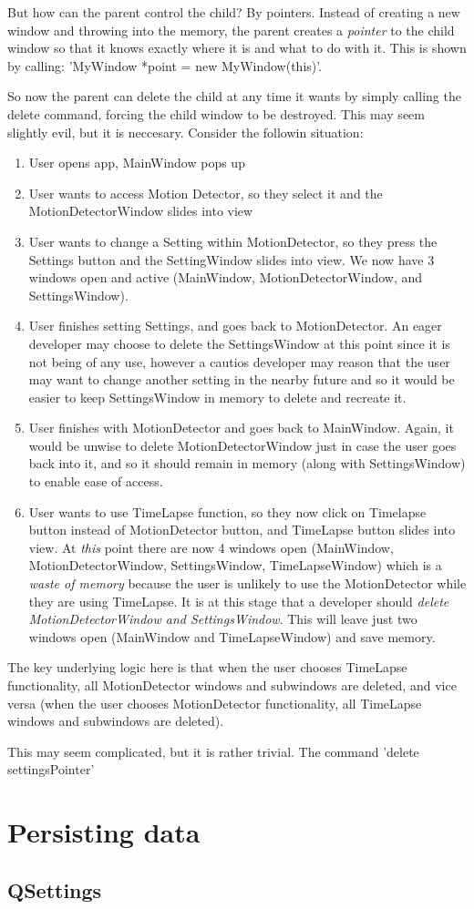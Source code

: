 But how can the parent control the child? By pointers. Instead of creating a new window and throwing into the memory, the parent creates a {\it pointer} to the child window so that it knows exactly where it is and what to do with it. This is shown by calling:
'MyWindow *point = new MyWindow(this)'.

So now the parent can delete the child at any time it wants by simply calling the delete command, forcing the child window to be destroyed. This may seem slightly evil, but it is neccesary. Consider the followin situation:
\begin{enumerate}
\item User opens app, MainWindow pops up
\item User wants to access Motion Detector, so they select it and the MotionDetectorWindow slides into view
\item User wants to change a Setting within MotionDetector, so they press the Settings button and the SettingWindow slides into view. We now have 3 windows open and active (MainWindow, MotionDetectorWindow, and SettingsWindow).
\item User finishes setting Settings, and goes back to MotionDetector. An eager developer may choose to delete the SettingsWindow at this point since it is not being of any use, however a cautios developer may reason that the user may want to change another setting in the nearby future and so it would be easier to keep SettingsWindow in memory to delete and recreate it.
\item User finishes with MotionDetector and goes back to MainWindow. Again, it would be unwise to delete MotionDetectorWindow just in case the user goes back into it, and so it should remain in memory (along with SettingsWindow) to enable ease of access.
\item User wants to use TimeLapse function, so they now click on Timelapse button instead of MotionDetector button, and TimeLapse button slides into view. At {\it this} point there are now 4 windows open (MainWindow, MotionDetectorWindow, SettingsWindow, TimeLapseWindow) which is a {\it waste of memory} because the user is unlikely to use the MotionDetector while they are using TimeLapse. It is at this stage that a developer should {\it delete MotionDetectorWindow and SettingsWindow}. This will leave just two windows open (MainWindow and TimeLapseWindow) and save memory.
\end{enumerate}
The key underlying logic here is that when the user chooses TimeLapse functionality, all MotionDetector windows and subwindows are deleted, and vice versa (when the user chooses MotionDetector functionality, all TimeLapse windows and subwindows are deleted).

This may seem complicated, but it is rather trivial. The command 'delete settingsPointer' 




\section{Persisting data}
\subsection{QSettings}

%